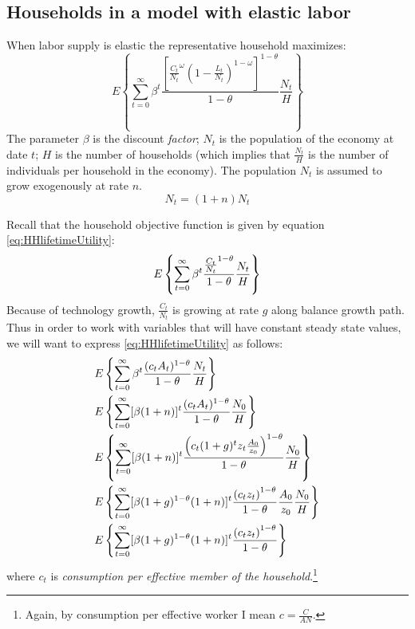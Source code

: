 \documentclass[11pt]{article}
\begin{document}
\subsection{Households in a model with elastic labor}
When labor supply is elastic the representative household maximizes:
	\begin{equation}\label{eq:HHlifetimeUtility}
		E\left\{\sum_{t=0}^{\infty} \beta^t \frac{\left[\frac{C_t}{N_t}^{\omega} \left(1 - \frac{L_t}{N_t}\right)^{1-\omega}\right]^{1-\theta}}{1-\theta} \frac{N_{t}}{H}\right\}
	\end{equation}
The parameter $\beta$ is the discount \textit{factor}; $N_{t}$ is the population of the economy at date $t$; $H$ is the number of households (which implies that $\frac{N_{t}}{H}$ is the number of individuals per household in the economy).  The population $N_{t}$ is assumed to grow exogenously at rate $n$.
	\begin{equation}\label{eq:popGrowth}
		N_{t} = (1 + n)N_{t}  
	\end{equation}
	
Recall that the household objective function is given by equation \ref{eq:HHlifetimeUtility}:
	\begin{equation}
		E\left\{\sum_{t=0}^{\infty} \beta^t \frac{\frac{C_t}{N_t}^{1-\theta}}{1-\theta} \frac{N_{t}}{H}\right\} \notag
	\end{equation}
Because of technology growth, $\frac{C_{t}}{N_{t}}$ is growing at rate $g$ along balance growth path. Thus in order to work with variables that will have constant steady state values, we will want to express \ref{eq:HHlifetimeUtility} as follows:
	\begin{align}
		&E\left\{\sum_{t=0}^{\infty} \beta^t \frac{(c_tA_t)^{1-\theta}}{1-\theta} \frac{N_{t}}{H}\right\} \notag \\
		&E\left\{\sum_{t=0}^{\infty} [\beta(1+n)]^t \frac{(c_tA_t)^{1-\theta}}{1-\theta} \frac{N_{0}}{H}\right\} \notag \\
		&E\left\{\sum_{t=0}^{\infty} [\beta(1+n)]^t \frac{\left(c_t(1+ g)^t z_t\frac{A_0}{z_0}\right)^{1-\theta}}{1-\theta} \frac{N_{0}}{H}\right\} \notag \\
		&E\left\{\sum_{t=0}^{\infty} [\beta(1+g)^{1-\theta}(1+n)]^t \frac{\left(c_t z_t\right)^{1-\theta}}{1-\theta} \frac{A_0}{z_0}\frac{N_{0}}{H}\right\} \notag \\
		&E\left\{\sum_{t=0}^{\infty} [\beta(1+g)^{1-\theta}(1+n)]^t \frac{\left(c_t z_t\right)^{1-\theta}}{1-\theta} \right\}
	\end{align}
where $c_{t}$ is \textit{consumption per effective member of the household}.\footnote{Again, by consumption per effective worker I mean $c = \frac{C}{AN}$.}
\end{document}
